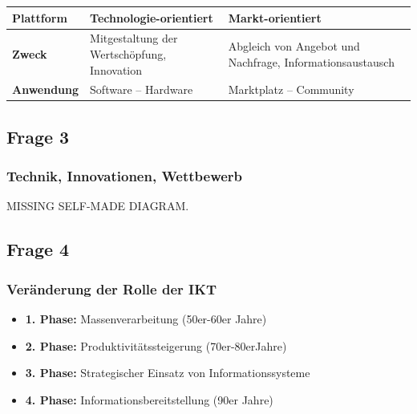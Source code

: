 \documentclass[a4paper]{article}
\begin{document}
			
			\begin{tabularx}{\textwidth}{X|X|X}
				\toprule
				\textbf{Plattform} & \textbf{Technologie-orientiert} & \textbf{Markt-orientiert} \\
				\midrule
				\textbf{Zweck} & Mitgestaltung der Wertschöpfung, Innovation & Abgleich von Angebot und Nachfrage, Informationsaustausch \\
				\midrule
				\textbf{Anwendung} & Software -- Hardware & Marktplatz -- Community \\
			\end{tabularx}
			
			\subsection{Frage 3}
			\label{le2-3}
			\subsubsection{Technik, Innovationen, Wettbewerb}
			MISSING SELF-MADE DIAGRAM.
			
			\subsection{Frage 4}
			\label{le2-4}
			\subsubsection{Veränderung der Rolle der IKT}
			\begin{itemize}
				\item [] \textbf{1. Phase:} Massenverarbeitung (50er-60er Jahre)
				\item [] \textbf{2. Phase:} Produktivitätssteigerung (70er-80erJahre)
				\item [] \textbf{3. Phase:} Strategischer Einsatz von Informationssysteme
				\item [] \textbf{4. Phase:} Informationsbereitstellung (90er Jahre)
			\end{itemize}
			\hrulefill
			
\end{document}
